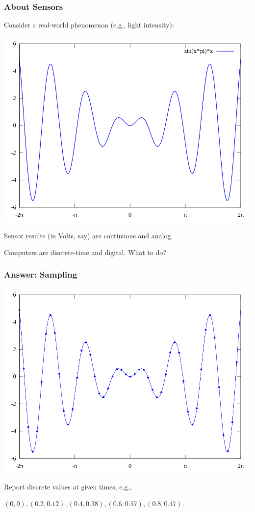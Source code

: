 \begin{frame}
\frametitle{About Sensors}

Consider a real-world phenomenon (e.g., light intensity):

\begin{center}
\includegraphics[width=.7\textwidth]{images/sine.png}
\end{center}

Sensor results (in Volts, say) are continuous and analog.

Computers are discrete-time and digital. What to do?
\end{frame}

\begin{frame}
\frametitle{Answer: Sampling}

\begin{center}
\includegraphics[width=.7\textwidth]{images/sine-points.png}
\end{center}

Report discrete values at given times, e.g.,
\begin{center}$(0, 0), (0.2, 0.12), (0.4, 0.38), (0.6, 0.57), (0.8, 0.47)$.\end{center}

\end{frame}

